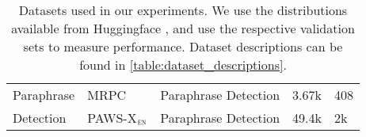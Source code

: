 \begin{table*}[ht]
\begin{tabular}{lllll}
  \midrule
  \multirow{1}{*}{Paraphrase} & MRPC \citep{dolan2004unsupervised} & Paraphrase Detection & 3.67k & 408 \\
  Detection & PAWS-X$_{\textsc{en}}$ \citep{yang-etal-2019-paws} & Paraphrase Detection & 49.4k & 2k \\
  \bottomrule
\end{tabular}
\caption{\label{table:datasets} Datasets used in our experiments. We use the distributions available from Huggingface \citep{lhoest-etal-2021-datasets}, and use the respective validation sets to measure performance. Dataset descriptions can be found in \autoref{table:dataset_descriptions}.}
\end{table*}


